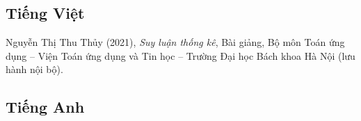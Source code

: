 \documentclass[oneside, a4paper, 12pt]{book}
\theoremstyle{plain}
\theoremstyle{definition}
\theoremstyle{remark}
\begin{document}
\begin{thebibliography}{99}\rm
{}

\subsection*{Tiếng Việt}
 Nguyễn Thị Thu Thủy (2021), {\it Suy luận thống kê}, Bài giảng, Bộ môn Toán ứng dụng -- Viện Toán ứng dụng và Tin học -- Trường Đại học Bách khoa Hà Nội (lưu hành nội bộ).

\subsection*{Tiếng Anh}

\end{thebibliography}
\end{document}
